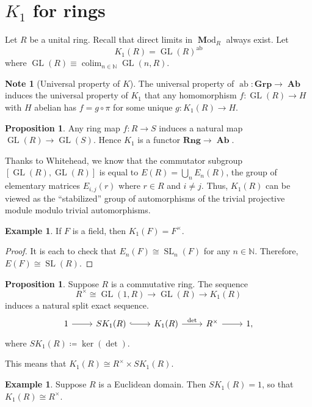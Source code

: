 \documentclass[10pt,letterpaper,cm]{nupset}
\theoremstyle{definition}
\newtheorem{exmp}[definition]{Example}
\newtheorem{note}[definition]{Note}
\theoremstyle{theorem}
\newtheorem{prop}[definition]{Proposition}
\theoremstyle{remark}
\newcommand{\N}{\mathbb N}
\newcommand{\1}{\mathbf{1}}
\newcommand{\0}{\vec 0}
\DeclareMathOperator*{\GL}{GL}
\DeclareMathOperator*{\SL}{SL}
\DeclareMathOperator{\ab}{ab}
\DeclareMathOperator{\colim}{colim}
\DeclareMathOperator{\Ab}{\mathbf{Ab}}
\DeclareMathOperator{\Mod}{\mathbf Mod}
\begin{document}
\section{$K_1$ for rings}


Let $R$ be a unital ring. Recall that direct limits in $\Mod_R$ always exist. Let $$K_1(R) = \GL(R)^{\ab}$$ where $\GL(R) \equiv\colim_{n \in \N} \GL(n, R)$.

\begin{note}[Universal property of $K$]
The universal property of $\ab: \mathbf{Grp} \to \Ab$ induces the universal property of $K_1$ that any homomorphism $f: \GL(R) \to H$ with $H$ abelian has $f = g \circ \pi$ for some unique $g: K_1(R) \to H$.
\end{note}

\begin{prop}
Any ring map $f: R \to S$ induces a natural map $\GL(R) \to \GL(S)$. Hence $K_1$ is a functor $\mathbf{Rng} \to \Ab$.
\end{prop}


Thanks to Whitehead, we know that the commutator subgroup $\left[\GL(R), \GL(R)\right]$ is equal to $E(R) = \bigcup_n E_n(R)$, the group of elementary matrices $E_{i, j}(r)$ where $r \in R$ and $i\ne j$. Thus, $K_1(R)$ can be viewed as the ``stabilized'' group of automorphisms of the trivial projective module modulo trivial automorphisms.


\begin{exmp}
If $F$ is a field, then $K_1(F) = F^{\times}$.
\end{exmp}
\begin{proof}
It is each to check that $E_n(F) \cong \SL_n(F)$ for any $n\in \N$. Therefore, $E(F) \cong \SL(R)$.
\end{proof}

\begin{prop}
Suppose $R$ is a commutative ring. The sequence  $$R^{\times} \cong \GL(1, R) \to \GL(R) \to K_1(R)$$ induces a natural split exact sequence.
\[
\begin{tikzcd}
1 \arrow[r] & SK_1(R) \arrow[r, hook] & K_1(R) \arrow[r, "\det"] & R^{\times} \arrow[r] & 1,
\end{tikzcd}
\]
where $SK_1(R) \coloneqq \ker(\det)$.
\end{prop}

This means that $K_1(R) \cong R^{\times} \times SK_1(R)$.

\begin{exmp}
Suppose $R$ is a Euclidean domain. Then $SK_1(R) =1$, so that $K_1(R) \cong R^{\times}$.
\end{exmp}
\end{document}
